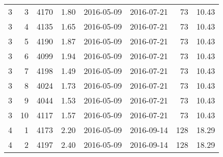 \begin{tabular}{rrrrllrr}
  3 & 3 & 4170 & 1.80 & 2016-05-09 & 2016-07-21 &  73 & 10.43 \\ 
  3 & 4 & 4135 & 1.65 & 2016-05-09 & 2016-07-21 &  73 & 10.43 \\ 
  3 & 5 & 4190 & 1.87 & 2016-05-09 & 2016-07-21 &  73 & 10.43 \\ 
  3 & 6 & 4099 & 1.94 & 2016-05-09 & 2016-07-21 &  73 & 10.43 \\ 
  3 & 7 & 4198 & 1.49 & 2016-05-09 & 2016-07-21 &  73 & 10.43 \\ 
  3 & 8 & 4024 & 1.73 & 2016-05-09 & 2016-07-21 &  73 & 10.43 \\ 
  3 & 9 & 4044 & 1.53 & 2016-05-09 & 2016-07-21 &  73 & 10.43 \\ 
  3 & 10 & 4117 & 1.57 & 2016-05-09 & 2016-07-21 &  73 & 10.43 \\\midrule
  4 & 1 & 4173 & 2.20 & 2016-05-09 & 2016-09-14 & 128 & 18.29 \\ 
  4 & 2 & 4197 & 2.40 & 2016-05-09 & 2016-09-14 & 128 & 18.29 \\ 
   \bottomrule \end{tabular}
